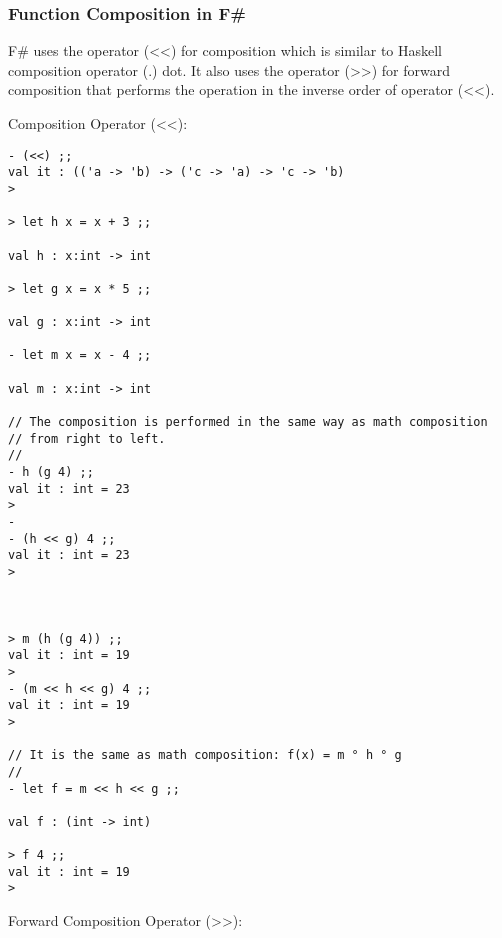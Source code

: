 \documentclass[11pt]{article}
\begin{document}
\subsubsection{Function Composition in F\#}
\label{sec-1-11-4}

F\# uses the operator (<<) for composition which is similar to Haskell
composition operator (.) dot. It also uses the operator (>>) for forward
composition that performs the operation in the inverse order of
operator (<<).

Composition Operator (<<):

\begin{verbatim}
- (<<) ;;
val it : (('a -> 'b) -> ('c -> 'a) -> 'c -> 'b) 
> 

> let h x = x + 3 ;;         

val h : x:int -> int

> let g x = x * 5 ;;

val g : x:int -> int

- let m x = x - 4 ;;

val m : x:int -> int

// The composition is performed in the same way as math composition 
// from right to left. 
//
- h (g 4) ;;
val it : int = 23
> 
- 
- (h << g) 4 ;;
val it : int = 23
> 



> m (h (g 4)) ;;
val it : int = 19
> 
- (m << h << g) 4 ;;
val it : int = 19
> 

// It is the same as math composition: f(x) = m ° h ° g
//
- let f = m << h << g ;;

val f : (int -> int)

> f 4 ;;
val it : int = 19
>
\end{verbatim}

Forward Composition Operator (>>):
\end{document}
